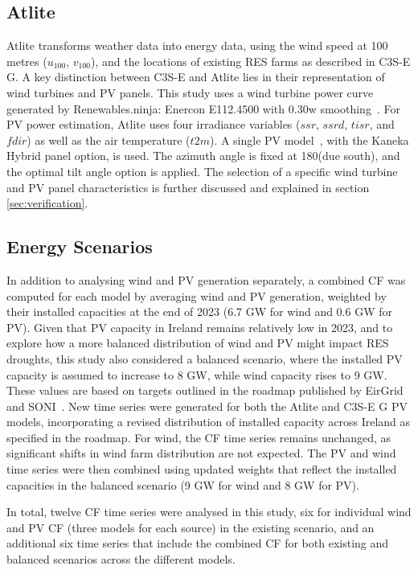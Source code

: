 \documentclass[a4paper, 11pt]{article}
\begin{document}
\subsection{Atlite} 
\label{sec:atlite}

Atlite transforms weather data into energy data, using the wind speed at 100 metres ($u_{100}$, $v_{100}$), and the locations of existing RES farms as described in C3S-E G. A key distinction between C3S-E and Atlite lies in their representation of wind turbines and PV panels. This study uses a wind turbine power curve generated by Renewables.ninja: Enercon E112.4500 with 0.30w smoothing~\cite{staffell2016wake}. For PV power estimation, Atlite uses four irradiance variables ($ssr$, $ssrd$, $tisr$, and $fdir$) as well as the air temperature ($t2m$). A single PV model~\cite{beyer2004pv}, with the Kaneka Hybrid panel option, is used. The azimuth angle is fixed at 180\textdegree (due south), and the optimal tilt angle option is applied. The selection of a specific wind turbine and PV panel characteristics is further discussed and explained in section \ref{sec:verification}.

\subsection{Energy Scenarios}
\label{sec:scenarios}

In addition to analysing wind and PV generation separately, a combined CF was computed for each model by averaging wind and PV generation, weighted by their installed capacities at the end of 2023 (6.7 GW for wind and 0.6 GW for PV). Given that PV capacity in Ireland remains relatively low in 2023, and to explore how a more balanced distribution of wind and PV might impact RES droughts, this study also considered a balanced scenario, where the installed PV capacity is assumed to increase to 8 GW, while wind capacity rises to 9 GW. These values are based on targets outlined in the roadmap published by EirGrid and SONI~\cite{eirgrid2023future}. New time series were generated for both the Atlite and C3S-E G PV models, incorporating a revised distribution of installed capacity across Ireland as specified in the roadmap. For wind, the CF time series remains unchanged, as significant shifts in wind farm distribution are not expected. The PV and wind time series were then combined using updated weights that reflect the installed capacities in the balanced scenario (9 GW for wind and 8 GW for PV).

In total, twelve CF time series were analysed in this study, six for individual wind and PV CF (three models for each source) in the existing scenario, and an additional six time series that include the combined CF for both existing and balanced scenarios across the different models.
\end{document}
